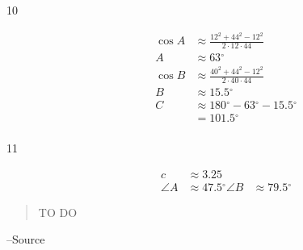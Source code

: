\documentclass{exam}
\newcommand{\dg}{\ensuremath{^\circ}}
\begin{document}
\begin{description}
      \item[10] 
        \begin{align*}
          \cos A & \approx \frac{ 12^2 + 44^2 - 12^2}{2 \cdot 12 \cdot 44} \\
          A      & \approx \boxed{ 63 \dg }
          \\
          \cos B & \approx \frac{ 40^2 + 44^2 - 12^2}{2 \cdot 40 \cdot 44} \\
          B      & \approx \boxed{ 15.5 \dg }
          \\
          C & \approx 180 \dg - 63 \dg - 15.5 \dg \\
            & = \boxed{ 101.5 \dg } \\
        \end{align*}

      \item[11]
        \begin{align*}
          c        & \approx 3.25 \\
          \angle A & \approx 47.5 \dg
          \angle B & \approx 79.5 \dg
        \end{align*}
    \end{description}

  \else
    \vspace{1 cm}
    \begin{quote}
      \begin{em}
        TO DO
      \end{em}
    \end{quote}
    \hspace{1 cm} --Source
  \fi
\end{document}
